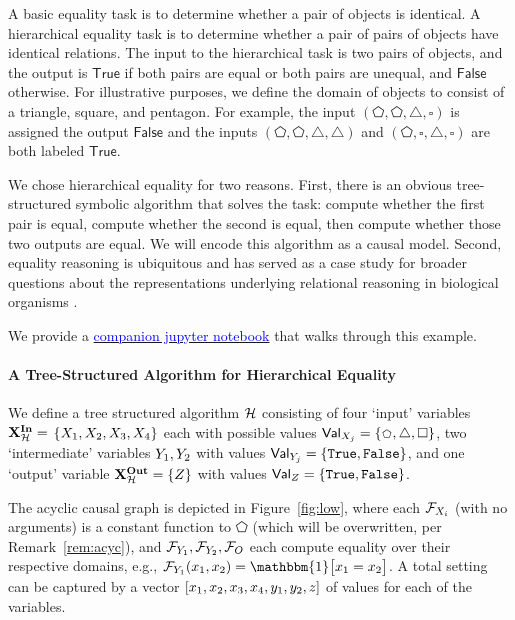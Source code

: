 \documentclass[twoside,11pt]{article}
\begin{document}
A basic equality task is to determine whether a pair of objects is identical. A hierarchical equality task is to determine whether a pair of pairs of objects have identical relations. The input to the hierarchical task is two pairs of objects, and the output is $\mathsf{True}$ if both pairs are equal or both pairs are unequal, and $\mathsf{False}$ otherwise. For illustrative purposes, we define the domain of objects to consist of a triangle, square, and pentagon. For example, the input $(\pentagon, \pentagon, \bigtriangleup, \square)$ is assigned the output $\mathsf{False}$ and the inputs $(\pentagon, \pentagon, \bigtriangleup, \bigtriangleup)$ and $(\pentagon, \square, \bigtriangleup, \square)$ are both labeled $\mathsf{True}$.
 
 We chose hierarchical equality for two reasons. First, there is an obvious tree-structured symbolic algorithm that solves the task: compute whether the first pair is equal, compute whether the second is equal, then compute whether those two outputs are equal. We will encode this algorithm as a causal model. Second, equality reasoning is ubiquitous and has served as a case study for broader questions about the representations underlying relational reasoning in biological organisms \citep{marcus:1999, alhama:2019, Geiger:Carstensen:Frank:Potts:2022}. 

 We provide a \href{https://github.com/stanfordnlp/pyvene/blob/main/tutorials/advanced_tutorials/DAS_Main_Introduction.ipynb}{\textcolor{blue}{companion jupyter notebook}} that walks through this example.


\paragraph{A Tree-Structured Algorithm for Hierarchical Equality}

We define a tree structured algorithm $\mathcal{H}$ consisting of four `input' variables $\mathbf{X}^{\mathbf{In}}_{\mathcal{H}} =$ $ \{X_1,X_2,X_3,X_4\}$ each with possible values $\values{\onevar_j} = \{\pentagon, \bigtriangleup, \square \normalsize\}$, two `intermediate' variables $Y_1, Y_2$ with values $\mathsf{Val}_{Y_j} = \{\texttt{True}, \texttt{False}\}$, and one `output' variable $\mathbf{X}^{\mathbf{Out}}_{\mathcal{H}} = \{Z\}$ with values $\mathsf{Val}_{Z} = \{\texttt{True}, \texttt{False}\}$. 

The acyclic causal graph is depicted in Figure~\ref{fig:low}, where each $\mathcal{F}_{X_i}$ (with no arguments) is a constant function to $\pentagon$ (which will be overwritten, per Remark~\ref{rem:acyc}), and $\mathcal{F}_{Y_1},\mathcal{F}_{Y_2},\mathcal{F}_{O}$ each compute equality over their respective domains, e.g., $\mechanism{\onevarr_1}(\oneval_1,\oneval_2) = \mathbbm{1}\big [\oneval_1=\oneval_2\big ]$. A total setting can be captured by a vector $[x_1,x_2,x_3, x_4,y_1,y_2,z]$ of values for each of the variables.
\end{document}
